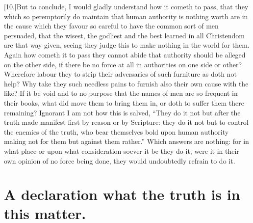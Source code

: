 [10.]But to conclude, I would gladly understand how it cometh to pass, that they which so peremptorily do maintain that human authority is nothing worth are in the cause which they favour so careful to have the common sort of men persuaded, that the wisest, the godliest and the best learned in all Christendom are that way given, seeing they judge this to make nothing in the world for them. Again how cometh it to pass they cannot abide that authority should be alleged on the other side, if there be no force at all in authorities on one side or other? Wherefore labour they to strip their adversaries of such furniture as doth not help? Why take they such needless pains to furnish also their own cause with the like? If it be void and to no purpose that the names of men are so frequent in their books,  what did move them to bring them in, or doth to suffer them there remaining? Ignorant I am not how this is salved, “They do it not but after the truth made manifest first by reason or by Scripture: they do it not but to control the enemies of the truth, who bear themselves bold upon human authority making not for them but against them rather.” Which answers are nothing: for in what place or upon what consideration soever it be they do it, were it in their own opinion of no force being done, they would undoubtedly refrain to do it.

\section*{A declaration what the truth is in this matter.}

